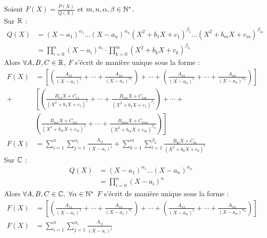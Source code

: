 \begin{theorem}
	Soient $F(X) = \frac{P(X)}{Q(X)}$ et $m, n, \alpha, \beta \in \mathbb{N}^*$.
	\\
	Sur $\mathbb{R}$ :
	\begin{align*}
		Q(X) &= (X - a_1)^{\alpha_1} \ldots (X - a_n)^{\alpha_n} (X^2 + b_1 X + c_1)^{\beta_1} \ldots (X^2 + b_m X + c_m)^{\beta_m} \\ 
            &= \prod_{i = 0}^{n} (X - a_i)^{\alpha_i} \cdot \prod_{k = 0}^{m} (X^2 + b_k X + c_k)^{\beta_k}
	\end{align*}
	Alors $\forall A, B, C \in \mathbb{R}$, $F$ s'écrit de manière unique sous la forme :
	\begin{align*}
		F(X) &= \left[ \left( \frac{A_{11}}{(X - a_1)^1} + \cdots + \frac{A_{1n}}{(X - a_1)^{\alpha_1}} \right) + \cdots + \left( \frac{A_{n1}}{(X - a_n)^1} + \cdots + \frac{A_{nn}}{(X - a_n)^{\alpha_n}}  \right) \right] \\
		+ &\left[ \left( \frac{B_{11}X + C_{11}}{(X^2 + b_1 X + c_1)^1} + \cdots + \frac{B_{1m}X + C_{1m}}{(X^2 + b_1 X + c_1)^{\beta_1}} \right) + \cdots + \right. \\
		&\left. \left( \frac{B_{m1}X + C_{m1}}{(X^2 + b_m X + c_m)^1} + \cdots + \frac{B_{mm}X + C_{mm}}{(X^2 + b_m X + c_m)^{\beta_m}}  \right) \right] \\
        F(X) &=  \sum_{i = 1}^{n} \sum_{j = 1}^{\alpha_i} \frac{A_{ij}}{\left(X - a_i\right)^{j} } + \sum_{k = 1}^{m} \sum_{l = 1}^{\beta_k} \frac{B_{kl}X + C_{kl}}{(X^2 + b_kX + c_k)^{l}}
	\end{align*}
	Sur $\mathbb{C}$ :
	\begin{align*}
		Q(X) &= (X - a_1)^{\alpha_1} \ldots (X - a_n)^{\alpha_n} \\
            &= \prod_{i = 0}^{n} (X - a_i)^{n}
	\end{align*}
	Alors $\forall A, B, C \in \mathbb{C}, \ \forall \alpha \in \mathbb{N}^*$  $F$ s'écrit de manière unique sous la forme :
	\begin{align*}
		F(X) &= \left[ \left( \frac{A_{11}}{(X - a_1)^1} + \cdots + \frac{A_{1n}}{(X - a_1)^{\alpha_1}} \right) + \cdots + \left( \frac{A_{n1}}{(X - a_n)^1} + \cdots + \frac{A_{nn}}{(X - a_n)^{\alpha_n}}  \right) \right] \\
        F(X) &=  \sum_{i = 1}^{n} \sum_{j = 1}^{\alpha_i} \frac{A_{ij}}{\left(X - a_i\right)^{j} }
	\end{align*}    
\end{theorem}

